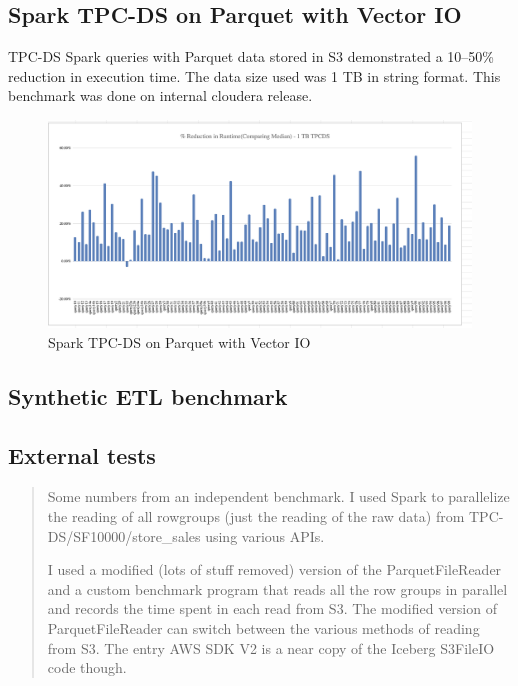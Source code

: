 \documentclass[manuscript]{acmart}
\begin{document}
\subsection{Spark TPC-DS on Parquet with Vector IO}
TPC-DS Spark queries with Parquet data stored in S3 demonstrated a 10–50\% reduction in
execution time. The data size used was 1 TB in string format. This benchmark was
done on internal cloudera release.

\begin{figure}
  \includegraphics[width=\linewidth]{spark_tpcds_vector_io.png}
  \caption{Spark TPC-DS on Parquet with Vector IO}
  \label{fig:spark_tpcds_vectored_io}
\end{figure}

\subsection{Synthetic ETL benchmark}


\subsection{External tests}

\begin{quotation}
 Some numbers from an independent benchmark.
 I used Spark to parallelize the reading of all rowgroups (just the reading of the raw data)
 from TPC-DS/SF10000/store_sales using various APIs.

I used a modified (lots of stuff removed) version of the ParquetFileReader and a custom
benchmark program that reads all the row groups in parallel and records the time spent in each read from S3.
The modified version of ParquetFileReader can switch between the various methods of reading from S3.
The entry AWS SDK V2 is a near copy of the Iceberg S3FileIO code though.

\end{quotation}
\end{document}

